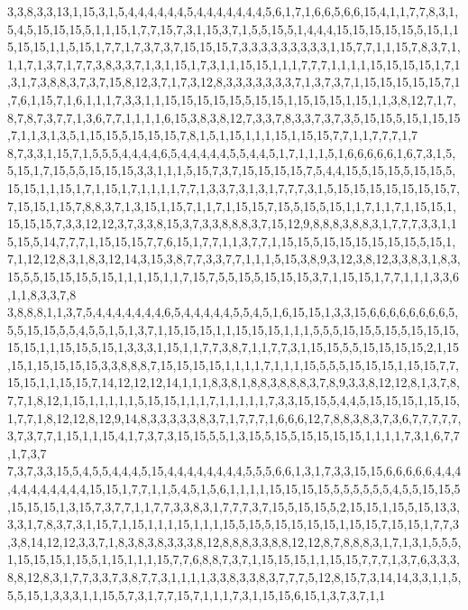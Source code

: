 3,3,8,3,3,13,1,15,3,1,5,4,4,4,4,4,4,5,4,4,4,4,4,4,4,5,6,1,7,1,6,6,5,6,6,15,4,1,1,7,7,8,3,1,5,4,5,15,15,15,5,1,1,15,1,7,7,15,7,3,1,15,3,7,1,5,5,15,5,1,4,4,4,15,15,15,15,15,5,15,1,15,15,15,1,1,5,15,1,7,7,1,7,3,7,3,7,15,15,15,7,3,3,3,3,3,3,3,3,3,1,15,7,7,1,1,15,7,8,3,7,1,1,1,7,1,3,7,1,7,7,3,8,3,3,7,1,3,1,15,1,7,3,1,1,15,15,1,1,1,7,7,7,1,1,1,1,15,15,15,15,1,7,1,3,1,7,3,8,8,3,7,3,7,15,8,12,3,7,1,7,3,12,8,3,3,3,3,3,3,3,7,1,3,7,3,7,1,15,15,15,15,15,7,1,7,6,1,15,7,1,6,1,1,1,7,3,3,1,1,15,15,15,15,15,5,15,15,1,15,15,15,1,15,1,1,3,8,12,7,1,7,8,7,8,7,3,7,7,1,3,6,7,7,1,1,1,1,6,15,3,8,3,8,12,7,3,3,7,8,3,3,7,3,7,3,5,15,15,5,15,1,15,15,7,1,1,3,1,3,5,1,15,15,5,15,15,15,7,8,1,5,1,15,1,1,1,15,1,15,15,7,7,1,1,7,7,7,1,7
8,7,3,3,1,15,7,1,5,5,5,4,4,4,4,6,5,4,4,4,4,4,5,5,4,4,5,1,7,1,1,1,5,1,6,6,6,6,6,1,6,7,3,1,5,5,15,1,7,15,5,5,15,15,15,3,3,1,1,1,5,15,7,3,7,15,15,15,15,7,5,4,4,15,5,15,15,5,15,15,5,15,15,1,1,15,1,7,1,15,1,7,1,1,1,1,7,7,1,3,3,7,3,1,3,1,7,7,7,3,1,5,15,15,15,15,15,15,15,7,7,15,15,1,15,7,8,8,3,7,1,3,15,1,15,7,1,1,7,1,15,15,7,15,5,15,5,15,1,1,7,1,1,7,1,15,15,1,15,15,15,7,3,3,12,12,3,7,3,3,8,15,3,7,3,3,8,8,8,3,7,15,12,9,8,8,8,3,8,8,3,1,7,7,7,3,3,1,15,15,5,14,7,7,7,1,15,15,15,7,7,6,15,1,7,7,1,1,3,7,7,1,15,15,5,15,15,15,15,15,15,5,15,1,7,1,12,12,8,3,1,8,3,12,14,3,15,3,8,7,7,3,3,7,7,1,1,1,5,15,3,8,9,3,12,3,8,12,3,3,8,3,1,8,3,15,5,5,15,15,15,5,15,1,1,1,15,1,1,7,15,7,5,5,15,5,15,15,15,3,7,1,15,15,1,7,7,1,1,1,3,3,6,1,1,8,3,3,7,8
3,8,8,8,1,1,3,7,5,4,4,4,4,4,4,4,6,5,4,4,4,4,4,5,5,4,5,1,6,15,15,1,3,3,15,6,6,6,6,6,6,6,6,5,5,5,15,15,5,5,4,5,5,1,5,1,3,7,1,15,15,15,1,1,15,15,15,1,1,1,5,5,5,15,15,5,15,5,15,15,15,15,15,1,1,15,15,5,15,1,3,3,3,1,15,1,1,7,7,3,8,7,1,1,7,7,3,1,15,15,5,5,15,15,15,15,2,1,15,15,1,15,15,15,15,3,3,8,8,8,7,15,15,15,15,1,1,1,1,7,1,1,1,15,5,5,5,15,15,15,1,15,15,7,7,15,15,1,1,15,15,7,14,12,12,12,14,1,1,1,8,3,8,1,8,8,3,8,8,8,3,7,8,9,3,3,8,12,12,8,1,3,7,8,7,7,1,8,12,1,15,1,1,1,1,1,5,15,15,1,1,1,7,1,1,1,1,1,7,3,3,15,15,5,4,4,5,15,15,15,1,15,15,1,7,7,1,8,12,12,8,12,9,14,8,3,3,3,3,3,8,3,7,1,7,7,7,1,6,6,6,12,7,8,8,3,8,3,7,3,6,7,7,7,7,7,3,7,3,7,7,1,15,1,1,15,4,1,7,3,7,3,15,15,5,5,1,3,15,5,15,5,15,15,15,15,1,1,1,1,7,3,1,6,7,7,1,7,3,7
7,3,7,3,3,15,5,4,5,5,4,4,4,5,15,4,4,4,4,4,4,4,4,5,5,5,6,6,1,3,1,7,3,3,15,15,6,6,6,6,6,4,4,4,4,4,4,4,4,4,4,4,15,15,1,7,7,1,1,5,4,5,1,5,6,1,1,1,1,15,15,15,15,5,5,5,5,5,5,4,5,5,15,15,5,15,15,15,1,3,15,7,3,7,7,1,1,7,7,3,3,8,3,1,7,7,7,3,7,15,5,15,15,5,2,15,15,1,15,5,15,13,3,3,3,1,7,8,3,7,3,1,15,7,1,15,1,1,1,15,1,1,1,15,5,15,5,15,15,15,15,1,15,15,7,15,15,1,7,7,3,3,8,14,12,12,3,3,7,1,8,3,8,3,8,3,3,3,8,12,8,8,8,3,3,8,8,12,12,8,7,8,8,8,3,1,7,1,3,1,5,5,5,1,15,15,15,1,15,5,1,15,1,1,1,15,7,7,6,8,8,7,3,7,1,15,15,15,1,1,15,15,7,7,7,1,3,7,6,3,3,3,8,8,12,8,3,1,7,7,3,3,7,3,8,7,7,3,1,1,1,1,3,3,8,3,3,8,3,7,7,7,5,12,8,15,7,3,14,14,3,3,1,1,5,5,5,15,1,3,3,3,1,1,15,5,7,3,1,7,7,15,7,1,1,1,7,3,1,15,15,6,15,1,3,7,3,7,1,1
